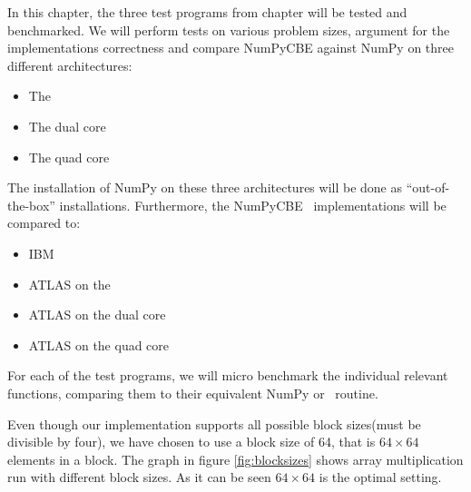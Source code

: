 %
%
%
%

In this chapter, the three test programs from
chapter  will be tested and
benchmarked. We will perform tests on various problem sizes, argument
for the implementations correctness and compare NumPyCBE against NumPy
on three different architectures:

\begin{itemize}
\item{The \PPE{}}
\item{The dual core}
\item{The quad core}
\end{itemize}

The installation of NumPy on these three architectures will be done as
``out-of-the-box'' installations. Furthermore, the NumPyCBE \BLAS\
implementations will be compared to:

\begin{itemize}
\item{IBM \BLAS{}}
\item{ATLAS on the \PPE{}}
\item{ATLAS on the dual core}
\item{ATLAS on the quad core}
\end{itemize}

For each of the test programs, we will micro benchmark the individual
relevant functions, comparing them to their equivalent NumPy or \BLAS\
routine.

Even though our implementation supports all possible block sizes(must
be divisible by four), we have chosen to use a block size of 64,
that is $64 \times 64$ elements in a block. The graph in
figure \ref{fig:blocksizes} shows array multiplication run with
different block sizes. As it can be seen $64 \times 64$ is the optimal
setting.

